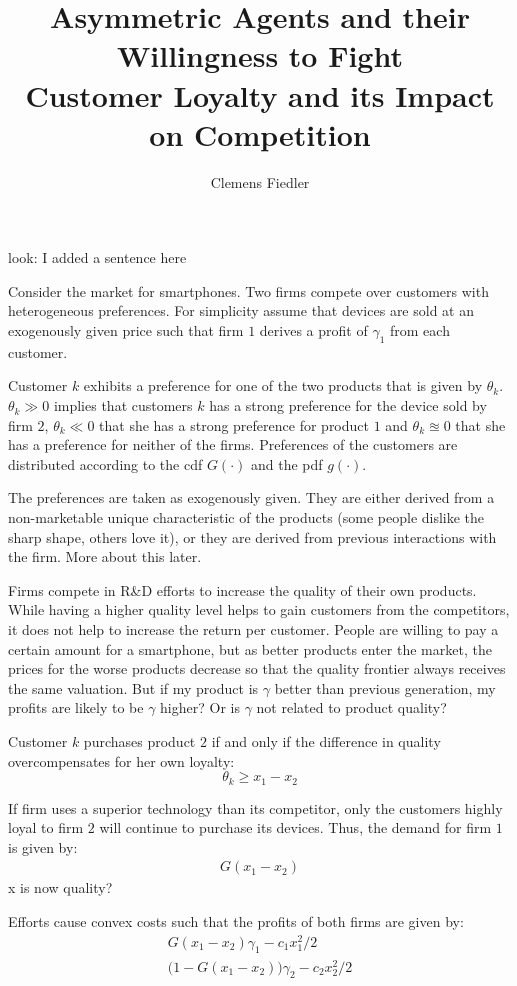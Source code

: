 \documentclass[a4paper, 11pt]{article}
\author{Clemens Fiedler}
\title{Asymmetric Agents and their Willingness to Fight\\
	Customer Loyalty and its Impact on Competition}
\begin{document}
	
\maketitle

look: I added a sentence here

Consider the market for smartphones. Two firms compete over customers with heterogeneous preferences. For simplicity assume that devices are sold at an exogenously given price such that firm $1$ derives a profit of $\gamma_1$ from each customer.

Customer $k$ exhibits a preference for one of the two products that is given by $\theta_k$. $\theta_k\gg0$ implies that customers $k$ has a strong preference for the device sold by firm $2$, $\theta_k\ll0$ that she has a strong preference for product $1$ and $\theta_k\approxeq 0$ that she has a preference for neither of the firms. Preferences of the customers are distributed according to the cdf $G(\cdot)$ and the pdf $g(\cdot)$.

The preferences are taken as exogenously given. They are either derived from a non-marketable unique characteristic of the products (some people dislike the sharp shape, others love it), or they are derived from previous interactions with the firm. More about this later.

Firms compete in R\&D efforts to increase the quality of their own products. While having a higher quality level helps to gain customers from the competitors, it does not help to increase the return per customer. People are willing to pay a certain amount for a smartphone, but as better products enter the market, the prices for the worse products decrease so that the quality frontier always receives the same valuation. But if my product is $\gamma$ better than previous generation, my profits are likely to be $\gamma$ higher? Or is $\gamma$ not related to product quality?

Customer $k$ purchases product $2$ if and only if the difference in quality overcompensates for her own loyalty:
$$\theta_k\geq x_1-x_2$$

If firm uses a superior technology than its competitor, only the customers highly loyal to firm $2$ will continue to purchase its devices. Thus, the demand for firm $1$ is given by:
\begin{align*}
G(x_1-x_2)
\end{align*}
x is now quality?

Efforts cause convex costs such that the profits of both firms are given by:
\begin{align}
G(x_1-x_2)\gamma_1 - c_1x_1^2/2\\
\big(1-G(x_1-x_2)\big)\gamma_2 - c_2x_2^2/2
\end{align}
\end{document}
